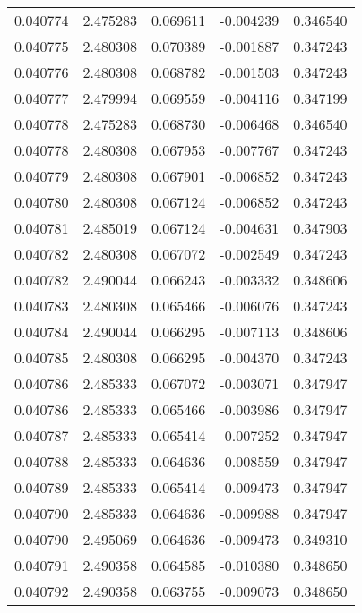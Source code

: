 \begin{tabular}{lrrrr}
0.040774    &  2.475283 &  0.069611 & -0.004239 &             0.346540 \\
0.040775    &  2.480308 &  0.070389 & -0.001887 &             0.347243 \\
0.040776    &  2.480308 &  0.068782 & -0.001503 &             0.347243 \\
0.040777    &  2.479994 &  0.069559 & -0.004116 &             0.347199 \\
0.040778    &  2.475283 &  0.068730 & -0.006468 &             0.346540 \\
0.040778    &  2.480308 &  0.067953 & -0.007767 &             0.347243 \\
0.040779    &  2.480308 &  0.067901 & -0.006852 &             0.347243 \\
0.040780    &  2.480308 &  0.067124 & -0.006852 &             0.347243 \\
0.040781    &  2.485019 &  0.067124 & -0.004631 &             0.347903 \\
0.040782    &  2.480308 &  0.067072 & -0.002549 &             0.347243 \\
0.040782    &  2.490044 &  0.066243 & -0.003332 &             0.348606 \\
0.040783    &  2.480308 &  0.065466 & -0.006076 &             0.347243 \\
0.040784    &  2.490044 &  0.066295 & -0.007113 &             0.348606 \\
0.040785    &  2.480308 &  0.066295 & -0.004370 &             0.347243 \\
0.040786    &  2.485333 &  0.067072 & -0.003071 &             0.347947 \\
0.040786    &  2.485333 &  0.065466 & -0.003986 &             0.347947 \\
0.040787    &  2.485333 &  0.065414 & -0.007252 &             0.347947 \\
0.040788    &  2.485333 &  0.064636 & -0.008559 &             0.347947 \\
0.040789    &  2.485333 &  0.065414 & -0.009473 &             0.347947 \\
0.040790    &  2.485333 &  0.064636 & -0.009988 &             0.347947 \\
0.040790    &  2.495069 &  0.064636 & -0.009473 &             0.349310 \\
0.040791    &  2.490358 &  0.064585 & -0.010380 &             0.348650 \\
0.040792    &  2.490358 &  0.063755 & -0.009073 &             0.348650 \\

\end{tabular}
